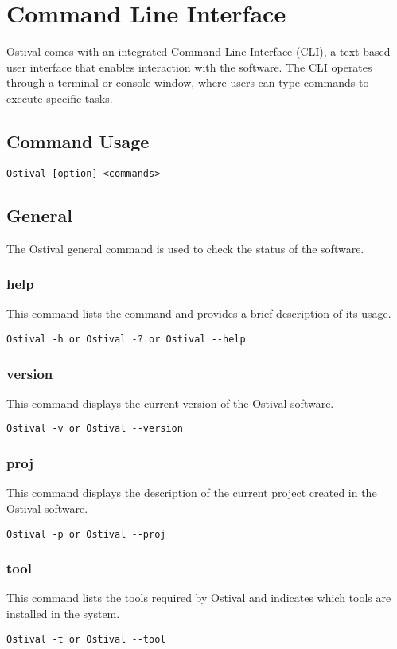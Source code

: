 \chapter{Command Line Interface}\label{ch:cli}
Ostival comes with an integrated Command-Line Interface (CLI), a text-based user interface that enables interaction with the software. The CLI operates through a terminal or console window, where users can type commands to execute specific tasks.

\section{Command Usage}
\begin{verbatim}
Ostival [option] <commands>
\end{verbatim}

\section{General}
The Ostival general command is used to check the status of the software.
\subsection{help}
This command lists the command and provides a brief description of its usage.
\begin{verbatim}
Ostival -h or Ostival -? or Ostival --help
\end{verbatim}

\subsection{version}
This command displays the current version of the Ostival software.
\begin{verbatim}
Ostival -v or Ostival --version
\end{verbatim}

\subsection{proj}
This command displays the description of the current project created in the Ostival software.
\begin{verbatim}
Ostival -p or Ostival --proj
\end{verbatim}

\subsection{tool}
This command lists the tools required by Ostival and indicates which tools are installed in the system.
\begin{verbatim}
Ostival -t or Ostival --tool
\end{verbatim}

